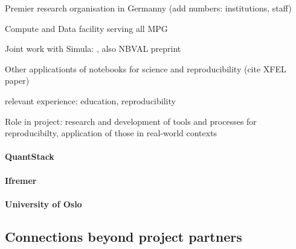 \begin{compactitem}
\item Premier research organisation in Germanny (add numbers: institutions,
  staff)
\item Compute and Data facility serving all MPG
\item Joint work with Simula: \cite{Beg2021}, also NBVAL preprint
\item Other applicationts of notebooks for science and reproducibility (cite
  XFEL paper)
\item relevant experience: education, reproducibility
\item Role in project: research and development of tools and processes for
  reproducibilty, application of those in real-world contexts
\end{compactitem}

\paragraph{QuantStack}


\paragraph{Ifremer}


\paragraph{University of Oslo}


\subsection{Connections beyond project partners}



% 
